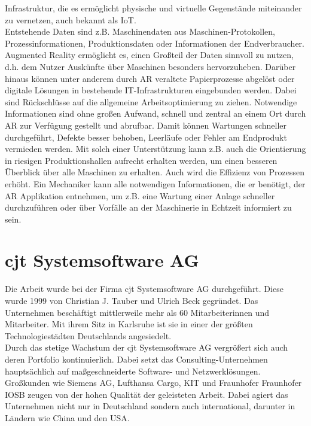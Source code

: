 Infrastruktur, die es ermöglicht physische und virtuelle Gegenstände miteinander zu vernetzen, auch bekannt als \ac{IoT}.
\\ 
Entstehende Daten sind z.B. Maschinendaten aus Maschinen-Protokollen, Prozessinformationen, Produktionsdaten oder 
Informationen der Endverbraucher. \cite{industrie40.2019f} Augmented Reality ermöglicht es, einen Großteil der Daten sinnvoll zu nutzen, d.h. 
dem Nutzer Auskünfte über Maschinen besonders hervorzuheben. Darüber hinaus können unter anderem durch \acs{AR} veraltete Papierprozesse 
abgelöst oder digitale Lösungen in bestehende IT-Infrastrukturen eingebunden werden. \cite{industrie40ar.2019n} 
Dabei sind Rückschlüsse auf die allgemeine Arbeitsoptimierung zu ziehen. Notwendige Informationen sind ohne 
großen Aufwand, schnell und zentral an einem Ort durch \acs{AR} zur Verfügung gestellt und abrufbar. Damit können 
Wartungen schneller durchgeführt, Defekte besser behoben, Leerläufe oder Fehler am Endprodukt vermieden werden. Mit solch einer Unterstützung 
kann z.B. auch die Orientierung in riesigen Produktionshallen aufrecht erhalten werden, um einen besseren Überblick über alle Maschinen 
zu erhalten. Auch wird die Effizienz von Prozessen erhöht. Ein Mechaniker kann alle notwendigen Informationen, die er benötigt, der 
\acl{AR} Applikation entnehmen, um z.B. eine Wartung einer Anlage schneller durchzuführen oder über Vorfälle an der Maschinerie in Echtzeit 
informiert zu sein. 
\pagebreak
\section{cjt Systemsoftware AG}
\label{chap:cjt}
Die Arbeit wurde bei der Firma cjt Systemsoftware AG durchgeführt. Diese wurde
1999 von Christian J. Tauber und Ulrich Beck gegründet. Das Unternehmen beschäftigt mittlerweile mehr als 60 Mitarbeiterinnen und Mitarbeiter.
Mit ihrem Sitz in Karlsruhe ist sie in einer der größten Technologiestädten Deutschlands angesiedelt.
\\
\linebreak
Durch das stetige Wachstum der cjt Systemsoftware AG vergrößert sich auch deren
Portfolio kontinuierlich. Dabei setzt das Consulting-Unternehmen hauptsächlich auf maßgeschneiderte
Software- und Netzwerklösungen. Großkunden wie Siemens AG, Lufthansa Cargo,
\ac{KIT} und Fraunhofer \acs{Fraunhofer IOSB} zeugen von der hohen Qualität der geleisteten Arbeit. 
Dabei agiert das Unternehmen nicht nur in Deutschland sondern auch international, darunter in Ländern wie China und den USA.
\pagebreak

